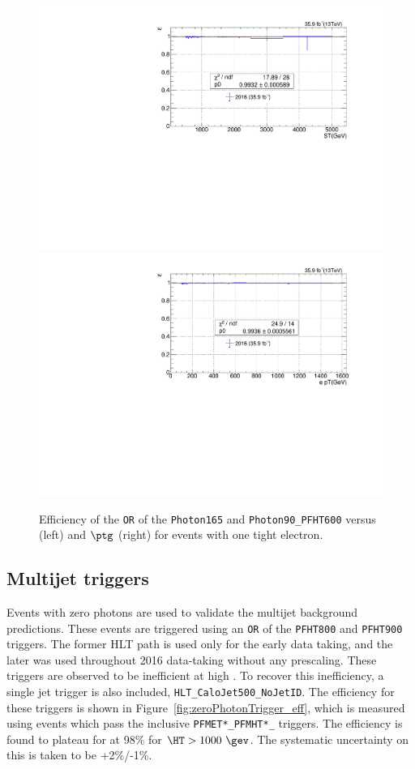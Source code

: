 \begin{figure}[htbp!]
  \centering
  \includegraphics[width=0.48\linewidth]{../Figures/Chap3/triggers/signalRegionTrigger_eff_versusST_tightEle.pdf}
  \includegraphics[width=0.48\linewidth]{../Figures/Chap3/triggers/signalRegionTrigger_eff_versusPt_tightEle.pdf}
  \captionsetup{width=.9\linewidth}
  \caption[Single electron CS trigger efficiency]{Efficiency of the \texttt{OR} of the \texttt{Photon165} and \texttt{Photon90\_PFHT600} versus \ST (left) and $\ptg$ 
    (right) for events with one tight electron.}
  \label{fig:signalTrigger_tightEle}
\end{figure}

\subsection{Multijet triggers}

Events with zero photons are used to validate the multijet background predictions.  These
events are triggered using an \texttt{OR} of the \texttt{PFHT800} and \texttt{PFHT900} 
triggers. The former HLT path is used only for the early data taking, and the later was 
used throughout 2016 data-taking without any prescaling. These triggers are observed to
be inefficient at high \HT. To recover this inefficiency, a single jet trigger is 
also included, \texttt{HLT\_CaloJet500\_NoJetID}.
The efficiency for these triggers is shown in Figure~\ref{fig:zeroPhotonTrigger_eff}, which is 
measured using events which 
pass the inclusive \texttt{PFMET*\_PFMHT*\_} triggers.  The efficiency is found to plateau
for at 98\% for $\HT>1000~\gev$.  The systematic uncertainty on this is taken to be +2\%/-1\%. 

